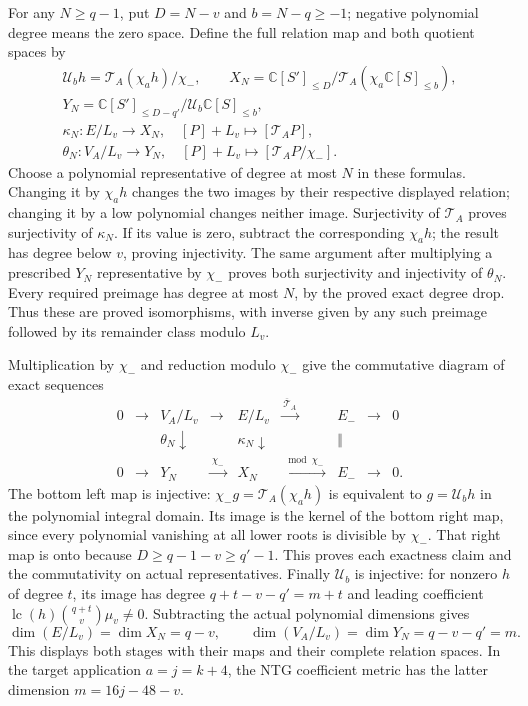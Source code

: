 \documentclass[11pt,a4paper]{article}
\begin{document}
For any $N\ge q-1$, put $D=N-v$ and $b=N-q\ge-1$; negative
polynomial degree means the zero space. Define the full relation map
and both quotient spaces by
\[
\begin{gathered}
 \mathcal U_b h=\mathcal T_A(\chi_a h)/\chi_-,\qquad
 X_N=\mathbb C[S']_{\le D}/
                \mathcal T_A(\chi_a\mathbb C[S]_{\le b}),\\
 Y_N=\mathbb C[S']_{\le D-q'}/
                \mathcal U_b\mathbb C[S]_{\le b},\\
 \kappa_N:E/L_v\longrightarrow X_N,\quad
    [P]+L_v\longmapsto[\mathcal T_AP],\\
 \theta_N:V_A/L_v\longrightarrow Y_N,\quad
    [P]+L_v\longmapsto[\mathcal T_AP/\chi_-].
\end{gathered}\tag{TAC1d}
\]
Choose a polynomial representative of degree at most $N$ in these
formulas. Changing it by $\chi_a h$ changes the two images by their
respective displayed relation; changing it by a low polynomial changes
neither image. Surjectivity of $\mathcal T_A$ proves surjectivity of
$\kappa_N$. If its value is zero, subtract the corresponding
$\chi_a h$; the result has degree below $v$, proving injectivity.
The same argument after multiplying a prescribed $Y_N$ representative
by $\chi_-$ proves both surjectivity and injectivity of $\theta_N$.
Every required preimage has degree at most $N$, by the proved exact
degree drop. Thus these are proved isomorphisms, with inverse given by
any such preimage followed by its remainder class modulo $L_v$.

Multiplication by $\chi_-$ and reduction modulo $\chi_-$ give the
commutative diagram of exact sequences
\[
\begin{array}{ccccccccc}
0&\longrightarrow&V_A/L_v&\longrightarrow&E/L_v
 &\xrightarrow{\ \overline{\mathcal T}_A\ }&E_-&\longrightarrow&0\\
 &&\theta_N\downarrow&&\kappa_N\downarrow&&\Vert\\
0&\longrightarrow&Y_N&\xrightarrow{\ \chi_-\ }&X_N
 &\xrightarrow{\ \bmod\chi_-\ }&E_-&\longrightarrow&0 .
\end{array}\tag{TAC1e}
\]
The bottom left map is injective: $\chi_-g=\mathcal T_A(\chi_a h)$
is equivalent to $g=\mathcal U_bh$ in the polynomial integral domain.
Its image is the kernel of the bottom right map, since every polynomial
vanishing at all lower roots is divisible by $\chi_-$. That right map
is onto because $D\ge q-1-v\ge q'-1$. This proves each exactness
claim and the commutativity on actual representatives.
Finally $\mathcal U_b$ is injective: for nonzero $h$ of degree $t$,
its image has degree $q+t-v-q'=m+t$ and leading coefficient
$\operatorname{lc}(h)\binom{q+t}{v}\mu_v\ne0$.
Subtracting the actual polynomial dimensions gives
\[
 \dim(E/L_v)=\dim X_N=q-v,
 \qquad \dim(V_A/L_v)=\dim Y_N=q-v-q'=m.
 \tag{TAC1f}
\]
This displays both stages with their maps and their complete relation
spaces. In the target application $a=j=k+4$, the NTG coefficient
metric has the latter dimension $m=16j-48-v$.
\end{document}
